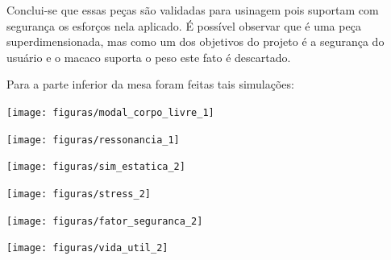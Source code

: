     Conclui-se que essas peças são validadas para usinagem pois suportam com segurança os esforços nela aplicado. É possível observar que é uma peça superdimensionada, mas como um dos objetivos do projeto é a segurança do usuário e o macaco suporta o peso este fato é descartado.

    Para a parte inferior da mesa foram feitas tais simulações:

    \begin{center}
    	\texttt{[image: figuras/modal\_corpo\_livre\_1]}
        \label{modal_corpo_livre_1}
    \end{center}

    \begin{center}
    	\texttt{[image: figuras/ressonancia\_1]}
        \label{ressonancia_1}
    \end{center}
    
    \begin{center}
    	\texttt{[image: figuras/sim\_estatica\_2]}
        \label{sim_estatica_2}
    \end{center}
    
    \begin{center}
    	\texttt{[image: figuras/stress\_2]}
        \label{stress_2}
    \end{center}
    
    \begin{center}
    	\texttt{[image: figuras/fator\_seguranca\_2]}
        \label{fator_seguranca_2}
    \end{center}
    
    \begin{center}
    	\texttt{[image: figuras/vida\_util\_2]}
        \label{vida_util_2}
    \end{center}


